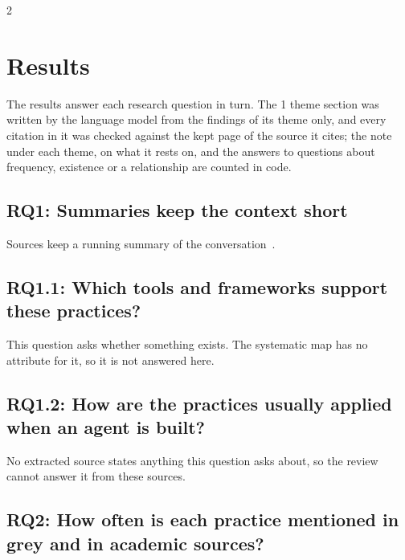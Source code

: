 \documentclass[10pt,a4paper]{article}
\begin{document}
\begin{multicols*}{2}

\section{Results}\label{sec:results}

The results answer each research question in turn.
The 1 theme section was written by the language model from the findings of its theme only, and every citation in it was checked against the kept page of the source it cites; the note under each theme, on what it rests on, and the answers to questions about frequency, existence or a relationship are counted in code.

\subsection{RQ1: Summaries keep the context short}\label{sec:rq1-summaries-keep-the-context-short}

Sources keep a running summary of the conversation~\cite{ana2025managing}.

\par\smallskip{}

\subsection{RQ1.1: Which tools and frameworks support these practices?}\label{sec:rq1-1-which-tools-and-frameworks-support}

This question asks whether something exists.
The systematic map has no attribute for it, so it is not answered here.

\subsection{RQ1.2: How are the practices usually applied when an agent is built?}\label{sec:rq1-2-how-are-the-practices-usually-appl}

No extracted source states anything this question asks about, so the review cannot answer it from these sources.

\subsection{RQ2: How often is each practice mentioned in grey and in academic sources?}\label{sec:rq2-how-often-is-each-practice-mentioned}


\end{multicols*}
\end{document}

